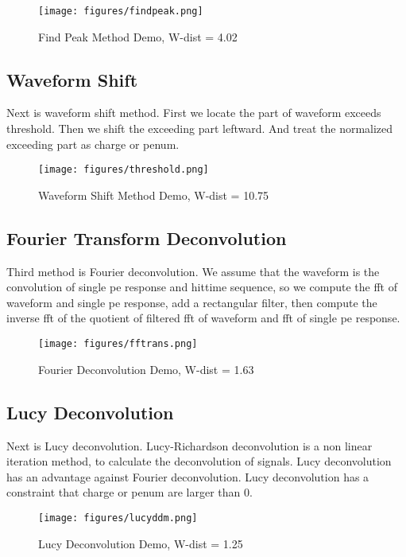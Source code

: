 \begin{figure}[H]
    \centering
    \caption{Find Peak Method Demo, W-dist = 4.02}
    \texttt{[image: figures/findpeak.png]}
\end{figure}

\subsection{Waveform Shift}
Next is waveform shift method. First we locate the part of waveform exceeds threshold. Then we shift the exceeding part leftward. And treat the normalized exceeding part as charge or penum. 

\begin{figure}[H]
    \centering
    \caption{Waveform Shift Method Demo, W-dist = 10.75}
    \texttt{[image: figures/threshold.png]}
\end{figure}

\subsection{Fourier Transform Deconvolution}
Third method is Fourier deconvolution. We assume that the waveform is the convolution of single pe response and hittime sequence, so we compute the fft of waveform and single pe response, add a rectangular filter, then compute the inverse fft of the quotient of filtered fft of waveform and fft of single pe response. 

\begin{figure}[H]
    \centering
    \caption{Fourier Deconvolution Demo, W-dist = 1.63}
    \texttt{[image: figures/fftrans.png]}
\end{figure}

\subsection{Lucy Deconvolution}
Next is Lucy deconvolution. Lucy-Richardson deconvolution is a non linear iteration method, to calculate the deconvolution of signals. Lucy deconvolution has an advantage against Fourier deconvolution. Lucy deconvolution has a constraint that charge or penum are larger than 0. 

\begin{figure}[H]
    \centering
    \caption{Lucy Deconvolution Demo, W-dist = 1.25}
    \texttt{[image: figures/lucyddm.png]}
\end{figure}

